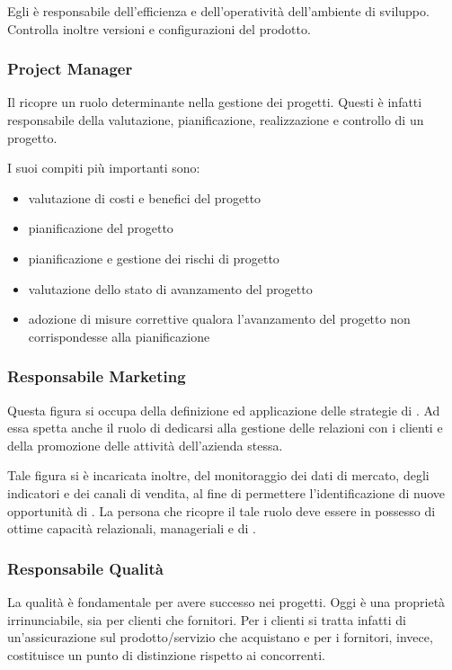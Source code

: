 	Egli è responsabile dell'efficienza e dell'operatività dell'ambiente di sviluppo. Controlla inoltre versioni e configurazioni del prodotto.
	
\subsubsection{Project Manager}
Il  ricopre un ruolo determinante nella gestione dei progetti. Questi è infatti responsabile della valutazione, pianificazione, realizzazione e controllo di un progetto.
	
I suoi compiti più importanti sono:
\begin{itemize}
	\item valutazione di costi e benefici del progetto
  \item pianificazione del progetto
	\item pianificazione e gestione dei rischi di progetto
	\item valutazione dello stato di avanzamento del progetto
	\item adozione di misure correttive qualora l'avanzamento del progetto non corrispondesse alla pianificazione
\end{itemize}

\subsubsection{Responsabile Marketing}
Questa figura si occupa della definizione ed applicazione delle strategie di \mktg. Ad essa spetta anche il ruolo di dedicarsi alla gestione delle relazioni con i clienti e della promozione delle attività dell'azienda stessa.
	
Tale figura si è incaricata inoltre, del monitoraggio dei dati di mercato, degli indicatori e dei canali di vendita, al fine di permettere l'identificazione di nuove opportunità di \bsn. La persona che ricopre il tale ruolo deve essere in possesso di ottime capacità relazionali, manageriali e di . 
	
\subsubsection{Responsabile Qualità}	
La qualità è fondamentale per avere successo nei progetti. Oggi è una proprietà irrinunciabile, sia per clienti che fornitori. Per i clienti si tratta infatti di un'assicurazione sul prodotto/servizio che acquistano e per i fornitori, invece, costituisce  un punto di distinzione rispetto ai concorrenti.
	
